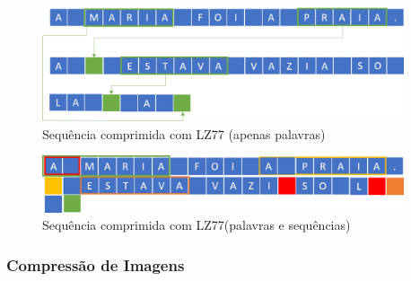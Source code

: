 \begin{figure}[htb]
\centering
\includegraphics[width=0.95\textwidth]{images/gzip.png}
\caption{Sequência comprimida com LZ77 (apenas palavras)}\label{gzip}
\end{figure}
\begin{figure}[htb]
\centering
\includegraphics[width=0.95\textwidth]{images/gzip2.png}
\caption{Sequência comprimida com LZ77(palavras e sequências)}\label{gzip2}
\end{figure}

\subsubsection{Compressão de Imagens}
\par

